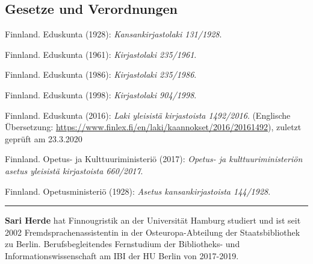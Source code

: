 \documentclass[a4paper,
fontsize=11pt,
oneside,
numbers=noperiodatend,
parskip=half-,
bibliography=totoc,
final
]{scrartcl}
\begin{document}
\hypertarget{gesetze-und-verordnungen}{%
\subsection{Gesetze und Verordnungen}\label{gesetze-und-verordnungen}}

Finnland. Eduskunta (1928): \emph{Kansankirjastolaki 131/1928}.

Finnland. Eduskunta (1961): \emph{Kirjastolaki 235/1961}.

Finnland. Eduskunta (1986): \emph{Kirjastolaki 235/1986}.

Finnland. Eduskunta (1998): \emph{Kirjastolaki 904/1998}.

Finnland. Eduskunta (2016): \emph{Laki yleisistä kirjastoista
1492/2016}. (Englische Übersetzung:
\url{https://www.finlex.fi/en/laki/kaannokset/2016/20161492}), zuletzt
geprüft am 23.3.2020

Finnland. Opetus- ja Kulttuuriministeriö (2017): \emph{Opetus- ja
kulttuuriministeriön asetus yleisistä kirjastoista 660/2017}.

Finnland. Opetusministeriö (1928): \emph{Asetus kansankirjastoista
144/1928}.

\begin{center}\rule{0.5\linewidth}{0.5pt}\end{center}

\textbf{Sari Herde} hat Finnougristik an der Universität Hamburg
studiert und ist seit 2002 Fremdsprachenassistentin in der
Osteuropa-Abteilung der Staatsbibliothek zu Berlin. Berufsbegleitendes
Fernstudium der Bibliotheks- und Informationswissenschaft am IBI der HU
Berlin von 2017-2019.
\end{document}
